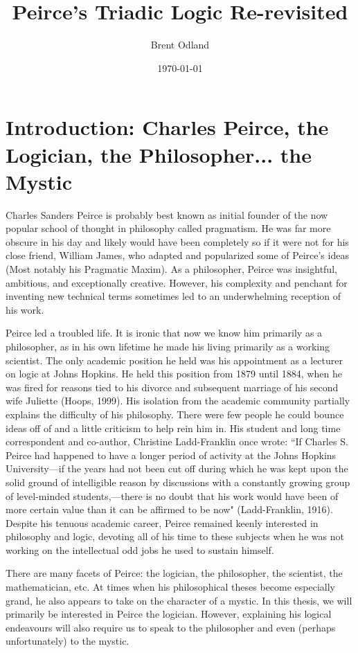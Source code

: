 \documentclass[12pt]{article}
\title{Peirce's Triadic Logic Re-revisited}
\date{\today}
\author{Brent Odland}
\begin{document}
\maketitle


\section{Introduction: Charles Peirce, the Logician, the Philosopher... the Mystic}
Charles Sanders Peirce is probably best known as initial founder of the now popular school of thought in philosophy  called pragmatism. He was far more obscure in his day and likely would have been completely so if it were not for his close friend, William James, who adapted and popularized some of Peirce's ideas (Most notably his Pragmatic Maxim). As a philosopher, Peirce was insightful, ambitious, and exceptionally creative. However, his complexity and penchant for inventing new technical terms sometimes led to an underwhelming reception of his work. 

Peirce led a troubled life. It is ironic that now we know him primarily as a philosopher, as in his own lifetime he made his living primarily as a working scientist. The only academic position he held was his appointment as a lecturer on logic at Johns Hopkins. He held this position from 1879 until 1884, when he was fired for reasons tied to his divorce and subsequent marriage of his second wife Juliette (Hoops, 1999). His isolation from the academic community partially explains the difficulty of his philosophy. There were few people he could bounce ideas off of and a little criticism to help rein him in. His student and long time correspondent and co-author, Christine Ladd-Franklin once wrote: ``If Charles S. Peirce had happened to have a longer period of activity at the Johns Hopkins University---if the years had not been cut off during which he was kept upon the solid ground of intelligible reason by discussions with a constantly growing group of level-minded students,---there is no doubt that his work would have been of more certain value than it can be affirmed to be now" (Ladd-Franklin, 1916). Despite his tenuous academic career, Peirce remained keenly interested in philosophy and logic, devoting all of his time to these subjects when he was not working on the intellectual odd jobs he used to sustain himself. 

There are many facets of Peirce: the logician, the philosopher, the scientist, the mathematician, etc. At times when his philosophical theses become especially grand, he also appears to take on the character of a mystic. In this thesis, we will primarily be interested in Peirce the logician. However, explaining his logical endeavours will also require us to speak to the philosopher and even (perhaps unfortunately) to the mystic.
\end{document}
